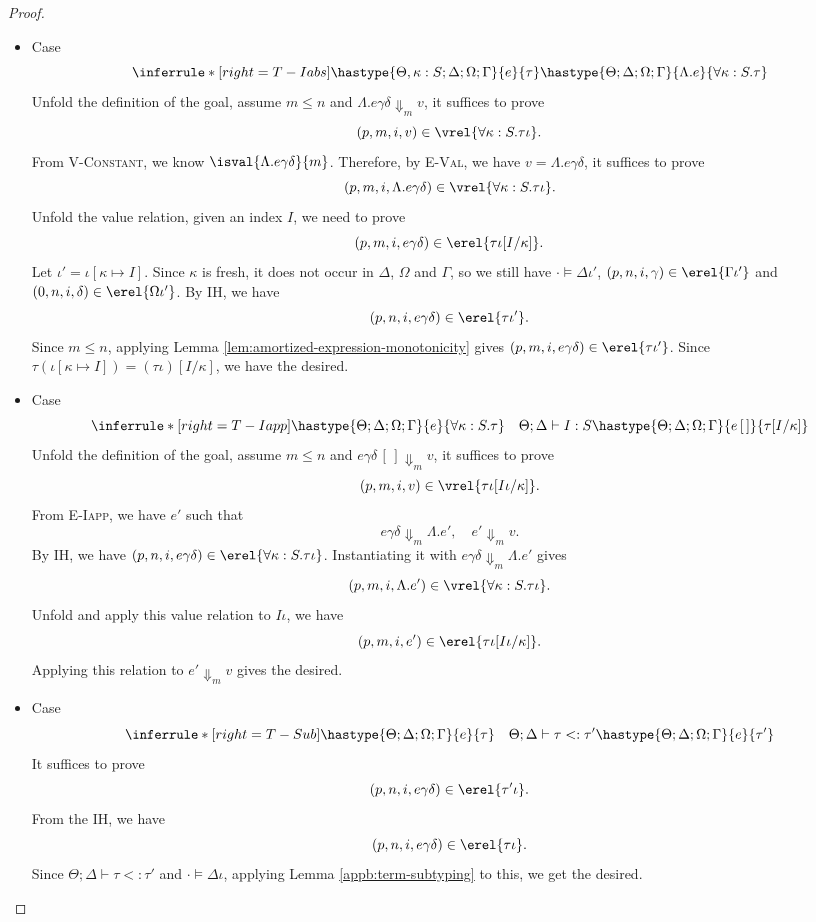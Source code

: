\begin{proof}
\begin{itemize}
\item Case
\[
  \inferrule*[right=T-Iabs]
        {\hastype{\Theta,\kappa:S;\Delta;\Omega;\Gamma}{e}{\tau}}
        {\hastype{\Theta;\Delta;\Omega;\Gamma}{\Lambda.e}{\forall\kappa:S.\tau}}
\]
Unfold the definition of the goal, assume $m\leq n$ and
$\Lambda.e\gamma\delta\Downarrow_m v$, it suffices to prove
\[(p, m, i, v)\in\vrel{\forall\kappa:S.\tau\iota}.\]
From \textsc{V-Constant}, we know $\isval{\Lambda.e\gamma\delta}{m}$.
Therefore, by \textsc{E-Val}, we have $v = \Lambda.e\gamma\delta$, it suffices to prove
\[(p, m, i, \Lambda.e\gamma\delta) \in \vrel{\forall\kappa:S.\tau\iota}.\]
Unfold the value relation, given an index $I$, we need to prove
\[(p, m, i, e\gamma\delta) \in \erel{\tau\iota[I/\kappa]}.\]
Let $\iota' = \iota[\kappa\mapsto I]$. Since $\kappa$ is fresh, it does not occur in $\Delta$, $\Omega$ and $\Gamma$,
so we still have $\cdot\models\Delta\iota'$, $(p,n,i,\gamma)\in\erel{\Gamma\iota'}$ and $(0,n,i,\delta)\in\erel{\Omega\iota'}$.
By IH, we have
\[(p, n, i, e\gamma\delta) \in \erel{\tau\iota'}.\]
Since $m \leq n$, applying Lemma \ref{lem:amortized-expression-monotonicity} gives $(p, m, i, e\gamma\delta) \in \erel{\tau\iota'}$.
Since $\tau(\iota[\kappa\mapsto I]) = (\tau\iota)[I/\kappa]$, we have the desired.

\item Case
\[
  \inferrule*[right=T-Iapp]
        {\hastype{\Theta;\Delta;\Omega;\Gamma}{e}{\forall\kappa:S.\tau}
         \quad \Theta;\Delta\vdash I:S}
        {\hastype{\Theta;\Delta;\Omega;\Gamma}{e\,[\,]}{\tau[I/\kappa]}}
\]
Unfold the definition of the goal, assume $m\leq n$ and
$e\gamma\delta\,[\,]\Downarrow_m v$, it suffices to prove
\[(p, m, i, v)\in\vrel{\tau\iota[I\iota/\kappa]}.\]
From \textsc{E-Iapp}, we have $e'$ such that
\[e\gamma\delta \Downarrow_m \Lambda.e', \quad e'\Downarrow_m v.\]
By IH, we have $(p, n, i, e\gamma\delta) \in \erel{\forall\kappa:S.\tau\iota}$.
Instantiating it with $e\gamma\delta \Downarrow_m \Lambda.e'$ gives
\[(p, m, i, \Lambda.e') \in \vrel{\forall\kappa:S.\tau\iota}.\]
Unfold and apply this value relation to $I\iota$, we have
\[(p, m, i, e') \in \erel{\tau\iota[I\iota/\kappa]}.\]
Applying this relation to $e'\Downarrow_m v$ gives the desired.

\item Case
\[
  \inferrule*[right=T-Sub]
        {\hastype{\Theta;\Delta;\Omega;\Gamma}{e}{\tau}
         \quad \Theta;\Delta\vdash\tau <: \tau'}
        {\hastype{\Theta;\Delta;\Omega;\Gamma}{e}{\tau'}}
\]
It suffices to prove
\[(p, n, i, e\gamma\delta)\in\erel{\tau'\iota}.\]
From the IH, we have
\[(p, n, i, e\gamma\delta)\in\erel{\tau\iota}.\]
Since $\Theta;\Delta\vdash\tau<:\tau'$ and $\cdot\models\Delta\iota$, applying Lemma \ref{appb:term-subtyping} to this,
we get the desired.


\end{itemize}
\end{proof}
